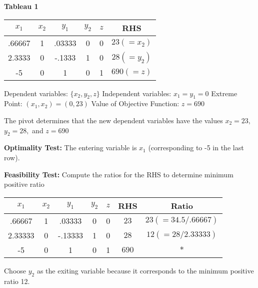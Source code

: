 \begin{example}
\textbf{Tableau 1}\newline

\begin{center}
\begin{tabular}{|c c c c c | c|}
\hline
$x_1$ & $x_2$ & $y_1$ & $y_2$ & $z$ & RHS \\ \hline
.66667 & 1 & .03333 & 0 & 0 & $23 (= x_2)$ \\
2.3333 & 0 & -.1333 & 1 & 0 & $28 (=y_2)$ \\ \hline
-5 & 0 & 1 & 0 & 1 & $690(=z)$ \\ \hline
\end{tabular}\newline
\end{center}

Dependent variables: $\{x_2,y_2,z\}$ \newline
Independent variables: $x_1=y_1=0$\newline
Extreme Point: $(x_1,x_2) = (0,23)$\newline
Value of Objective Function: $z=690$\newline

The pivot determines that the new dependent variables have the values $x_2 = 23,$ $y_2 = 28,$ and $z=690$\newline

\textbf{Optimality Test:} The entering variable is $x_1$ (corresponding to -5 in the last row).\newline

\textbf{Feasibility Test:}	Compute the ratios for the RHS to determine minimum positive ratio\newline

\begin{center}
\begin{tabular}{| c c c c c | c | c |}
\hline
$x_1$ & $x_2$ & $y_1$ & $y_2$ & $z$ & RHS & Ratio \\ \hline
.66667 & 1 & .03333 & 0 & 0 & $23$ & $23 (=34.5/.66667)$ \\
2.33333 & 0 & -.13333 & 1 & 0 & $28$ & $12 (=28/2.33333)$\\ \hline
-5 & 0 & 1 & 0 & 1 & $690$ & $*$\\ \hline
\end{tabular}\newline
\end{center}

Choose $y_2$ as the exiting variable because it corresponds to the minimum positive ratio 12. \newline


\end{example}
